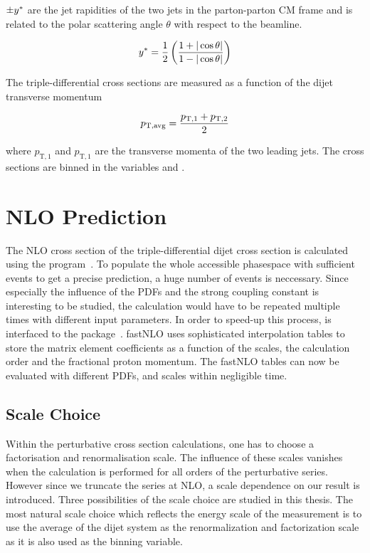$\pm y^*$ are the jet rapidities of the two jets in the
parton-parton CM frame and is related to the polar scattering angle $\theta$ with respect
to the beamline. 

\begin{equation*}
    y^* = \frac{1}{2} \left( \frac{1 + |\cos \theta|}{1- | \cos \theta|}
    \right)
\end{equation*}

The triple-differential cross sections are measured as a function of the dijet transverse momentum
\ptavg

\begin{equation*}
    p_{\mathrm{T,avg}} = \frac{p_{\mathrm{T},1} + p_{\mathrm{T},2}}{2}
\end{equation*}

where $p_{\mathrm{T},1}$ and $p_{\mathrm{T},1}$ are the transverse momenta of
the two leading jets. The cross sections are binned in the variables \ystar and
\yboost. 

\section{NLO Prediction}

The NLO cross section of the triple-differential dijet cross section is
calculated using the \NLOJETPP program~\cite{nlojetpp}. To populate the whole
accessible phasespace with sufficient events to get a precise prediction, a huge
number of events is neccessary. Since especially the influence of the PDFs and
the strong coupling constant is interesting to be studied, the calculation would
have to be repeated multiple times with different input parameters. In order to
speed-up this process, \NLOJETPP is interfaced to the \fastNLO
package~\cite{fastnlo}. fastNLO uses sophisticated interpolation tables to store
the matrix element coefficients as a function of the scales, the calculation
order and the fractional proton momentum. The fastNLO tables can now be evaluated with
different PDFs, \as and scales within negligible time. 

\subsection{Scale Choice}

Within the perturbative cross section calculations, one has to choose a
factorisation and renormalisation scale. The influence of these scales vanishes
when the calculation is performed for all orders of the perturbative series.
However since we truncate the series at NLO, a scale dependence on our result is
introduced. Three possibilities of the scale choice are studied in this thesis.
The most natural scale choice which reflects the energy scale of the measurement
is to use the average \pt of the dijet system as the renormalization and
factorization scale as it is also used as the binning variable. 

